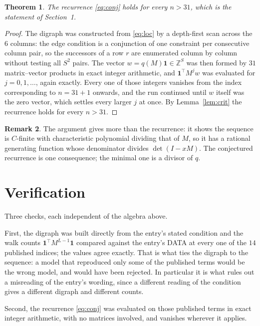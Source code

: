 \documentclass[11pt,a4paper]{article}
\theoremstyle{plain}
\newtheorem{theorem}{Theorem}
\theoremstyle{definition}
\newtheorem{remark}[theorem]{Remark}
\begin{document}
\begin{theorem}
The recurrence \eqref{eq:conj} holds for every $n>31$, which is the statement of
Section~1.
\end{theorem}

\begin{proof}
The digraph was constructed from \eqref{eq:loc} by a depth-first scan across the $6$
columns: the edge condition is a conjunction of one constraint per consecutive column
pair, so the successors of a row $r$ are enumerated column by column without testing all
$S^2$ pairs. The vector $w=q(M)\mathbf{1}\in\mathbb{Z}^{S}$ was then formed by $31$
matrix--vector products in exact integer arithmetic, and $\mathbf{1}^{\!\top}M^{j}w$ was
evaluated for $j=0,1,\dots$, again exactly. Every one of those integers vanishes from the
index corresponding to $n=31+1$ onwards, and the run continued until $w$ itself was the
zero vector, which settles every larger $j$ at once. By Lemma~\ref{lem:crit} the recurrence
holds for every $n>31$.
\end{proof}

\begin{remark}
The argument gives more than the recurrence: it shows the sequence is $C$-finite with
characteristic polynomial dividing that of $M$, so it has a rational generating function
whose denominator divides $\det(I-xM)$. The conjectured recurrence is one consequence; the
minimal one is a divisor of $q$.
\end{remark}

\section{Verification}

Three checks, each independent of the algebra above.

First, the digraph was built directly from the entry's stated condition and the walk counts
$\mathbf{1}^{\!\top}M^{L-1}\mathbf{1}$ compared against the entry's DATA at
every one of the $14$ published indices; the values agree exactly. That is what ties
the digraph to the sequence: a model that reproduced only some of the published terms would
be the wrong model, and would have been rejected. In particular it is what rules out a
misreading of the entry's wording, since a different reading of the condition gives a
different digraph and different counts.

Second, the recurrence \eqref{eq:conj} was evaluated on those published terms in exact
integer arithmetic, with no matrices involved, and vanishes wherever it applies.
\end{document}
